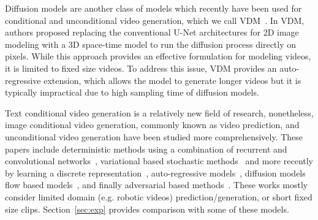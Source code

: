 

Diffusion models are another class of models which recently have been used for conditional and unconditional video generation, which we call VDM~\cite{ho2022video}. In VDM, authors proposed replacing the conventional U-Net architectures for 2D image modeling with a 3D space-time model to run the diffusion process directly on pixels. %
While this approach provides an effective formulation for modeling videos, it is limited to fixed size videos. To address this issue, VDM provides an auto-regressive extension, which allows the model to generate longer videos but it is typically impractical due to high sampling time of diffusion models.

Text conditional video generation is a relatively new field of research, nonetheless, image conditional video generation, commonly known as video prediction, and unconditional video generation have been studied more comprehensively. These papers include deterministic methods using a combination of recurrent and convolutional networks~\cite{ranzato2014video,srivastava2015unsupervised,finn2016unsupervised, wang2017predrnn}, variational based stochastic methods~\cite{babaeizadeh2017stochastic,svg,villegas2019high,fitvid} and more recently by learning a discrete representation~\cite{videovqvae,rakhimov2020latent,transframer}, auto-regressive models~\cite{videotranf,videogpt,ccvs,harp}, diffusion models~\cite{mcvd,harvey2022flexible,yang2022diffusion,diff4pred} flow based models~\cite{kumar2019videoflow}, and finally adversarial based methods~\cite{vondrick2016generating,saito2017temporal,tulyakov2018mocogan,clark2019adversarial,saito2020train,trIVD}. These works mostly consider limited domain (e.g. robotic videos) prediction/generation, or short fixed size clips. Section~\ref{sec:exp} provides comparison with some of these models.
